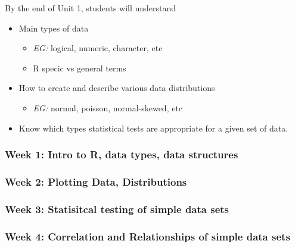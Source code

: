 \documentclass[
]{book}
\providecommand{\tightlist}{%
  \setlength{\itemsep}{0pt}\setlength{\parskip}{0pt}}
\begin{document}
By the end of Unit 1, students will understand

\begin{itemize}
\tightlist
\item
  Main types of data

  \begin{itemize}
  \tightlist
  \item
    \emph{EG:} logical, numeric, character, etc
  \item
    R specic vs general terms
  \end{itemize}
\item
  How to create and describe various data distributions

  \begin{itemize}
  \tightlist
  \item
    \emph{EG:} normal, poisson, normal-skewed, etc
  \end{itemize}
\item
  Know which types statistical tests are appropriate for a given set of data.
\end{itemize}

\hypertarget{week-1-intro-to-r-data-types-data-structures}{%
\subsubsection*{Week 1: Intro to R, data types, data structures}\label{week-1-intro-to-r-data-types-data-structures}}

\hypertarget{week-2-plotting-data-distributions}{%
\subsubsection*{Week 2: Plotting Data, Distributions}\label{week-2-plotting-data-distributions}}

\hypertarget{week-3-statisitcal-testing-of-simple-data-sets}{%
\subsubsection*{Week 3: Statisitcal testing of simple data sets}\label{week-3-statisitcal-testing-of-simple-data-sets}}

\hypertarget{week-4-correlation-and-relationships-of-simple-data-sets}{%
\subsubsection*{Week 4: Correlation and Relationships of simple data sets}\label{week-4-correlation-and-relationships-of-simple-data-sets}}
\end{document}
